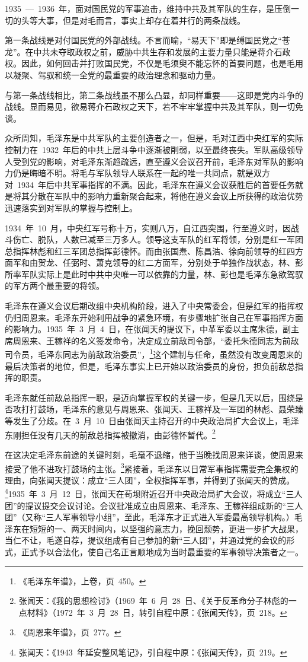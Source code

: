1935~—~1936~年，面对国民党的军事追击，维持中共及其军队的生存，是压倒一切的头等大事，但是对毛而言，事实上却存在着并行的两条战线。

第一条战线是对付国民党的外部战线。不言而喻，“易天下”即是缚国民党之“苍龙”。在中共未夺取政权之前，威胁中共生存和发展的主要力量只能是蒋介石政权。因此，如何回击并打败国民党，不仅是毛须臾不能忘怀的首要问题，也是毛用以凝聚、驾驭和统一全党的最重要的政治理念和驱动力量。

与第一条战线相比，第二条战线虽不那么凸显，却同样重要——这即是党内斗争的战线。显而易见，欲易蒋介石政权之天下，若不牢牢掌握中共及其军队，则一切免谈。

众所周知，毛泽东是中共军队的主要创造者之一，但是，毛对江西中央红军的实际控制力在~1932~年后的中共上层斗争中逐渐被削弱，以至最终丧失。军队高级领导人受到党的影响，对毛泽东渐趋疏远，直至遵义会议召开前，毛泽东对军队的影响力仍是晦暗不明。将毛与军队领导人联系在一起的唯一共同点，就是双方对~1934~年后中共军事指挥的不满。因此，毛泽东在遵义会议获胜后的首要任务就是将其分散在军队中的影响力重新聚合起来，将他在遵义会议上所获得的政治优势迅速落实到对军队的掌握与控制上。

1934~年~10~月，中央红军号称十万，实则八万，自江西突围，行至遵义时，因战斗伤亡、脱队，人数已减至三万多人。领导这支军队的红军将领，分别是红一军团总指挥林彪和红三军团总指挥彭德怀。而由张国焘、陈昌浩、徐向前领导的红四方面军和由贺龙、任弼时、萧克领导的红二方面军，分别处于单独作战状态，林、彭所率军队实际上是此时中共中央唯一可以依靠的力量，林、彭也是毛泽东急欲驾驭的军方两个最重要的将领。

毛泽东在遵义会议后期改组中央机构阶段，进入了中央常委会，但是红军的指挥权仍归周恩来。毛泽东开始利用战争的紧急环境，有步骤地扩张自己在军事指挥方面的影响力。1935~年~3~月~4~日，在张闻天的提议下，中革军委以主席朱德，副主席周恩来、王稼祥的名义签发命令，决定成立前敌司令部，“委托朱德同志为前敌司令员，毛泽东同志为前敌政治委员”，\footnote{《毛泽东年谱》，上卷，页~450。}这个建制与任命，虽然没有改变周恩来的最后决策者的地位，但是，毛泽东事实上已开始以政治委员的身份，担负前敌总指挥的职责。

毛泽东就任前敌总指挥一职，是迈向掌握军权的关键一步，但是几天以后，围绕是否攻打打鼓场，毛泽东的意见与周恩来、张闻天、王稼祥及一军团的林彪、聂荣臻等发生了分歧。在~3~月~10~日由张闻天主持召开的中央政治局扩大会议上，毛泽东刚担任没有几天的前敌总指挥被撤消，由彭德怀暂代。\footnote{张闻天：《我的思想检讨》（1969~年~6~月~28~日、《关于反革命分子林彪的一点材料》（1972~年~3~月~28~日，转引自程中原：《张闻天传》，页~218。}

在这决定毛泽东前途的关键时刻，毛毫不退缩，他于当晚找周恩来详谈，使周恩来接受了他不进攻打鼓场的主张。\footnote{《周恩来年谱》，页~277。}紧接着，毛泽东以日常军事指挥需要完全集权的理由，向张闻天提议：成立“三人团”，全权指挥军事，并得到了张闻天的赞成。\footnote{张闻天：《1943~年延安整风笔记》，引自程中原：《张闻天传》，页~219。}1935~年~3~月~12~日，张闻天在苟坝附近召开中央政治局扩大会议，将成立“三人团”的提议提交会议讨论。会议批准成立由周恩来、毛泽东、王稼祥组成新的“三人团”（又称“三人军事领导小组”，至此，毛泽东才正式进入军委最高领导机构。）毛泽东在短短的一、两天时间内，以坚强的意志力，挽回颓势，更进一步扩大战果，当仁不让，毛遂自荐，提议组成有自己参加的新“三人团”，并通过党的会议的形式，正式予以合法化，使自己名正言顺地成为当时最重要的军事领导决策者之一。

